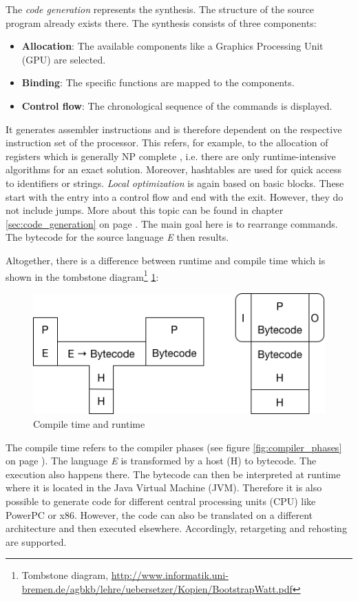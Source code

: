 The \emph{code generation} represents the synthesis. The structure of the source program already exists there. The synthesis consists of three components: 
\begin{itemize}
	\item \textbf{Allocation}: The available components like a Graphics Processing Unit (GPU) are selected.
	\item \textbf{Binding}: The specific functions are mapped to the components.
	\item \textbf{Control flow}: The chronological sequence of the commands is displayed.
\end{itemize}
It generates assembler instructions and is therefore dependent on the respective instruction set of the processor. This refers, for example, to the allocation of registers which is generally NP complete \cite{bdr2006}, i.e. there are only runtime-intensive algorithms for an exact solution. Moreover, hashtables are used for quick access to identifiers or strings. \emph{Local optimization} is again based on basic blocks. These start with the entry into a control flow and end with the exit. However, they do not include jumps. More about this topic can be found in chapter \ref{sec:code_generation} on page \pageref{sec:code_generation}. The main goal here is to rearrange commands. The bytecode for the source language \emph{E} then results.

Altogether, there is a difference between runtime and compile time which is shown in the tombstone diagram\footnote{Tombstone diagram, \url{http://www.informatik.uni-bremen.de/agbkb/lehre/uebersetzer/Kopien/BootstrapWatt.pdf}} \ref{fig:compile_time_runtime}:

\begin{figure}[bth]
	\centering
	\includegraphics[scale=0.5]{./img/compile_time_runtime}
	\caption[Compile time and runtime]{Compile time and runtime}
	\label{fig:compile_time_runtime}
\end{figure}
\noindent

The compile time refers to the compiler phases (see figure \ref{fig:compiler_phases} on page \pageref{fig:compiler_phases}). The language \emph{E} is transformed by a host (H) to bytecode. The execution also happens there. The bytecode can then be interpreted at runtime where it is located in the Java Virtual Machine (JVM). Therefore it is also possible to generate code for different central processing units (CPU) like PowerPC or x86. However, the code can also be translated on a different architecture and then executed elsewhere. Accordingly, retargeting and rehosting are supported.

